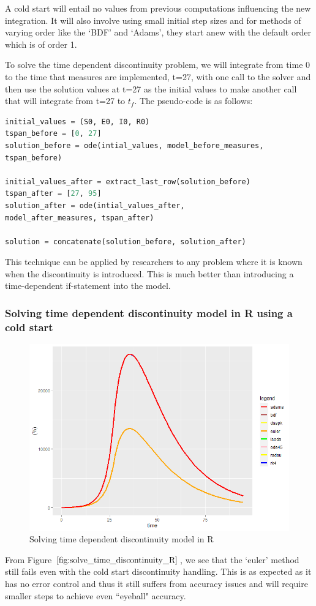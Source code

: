A cold start will entail no values from previous computations influencing the new integration. It will also involve using small initial step sizes and for methods of varying order like the `BDF' and `Adams', they start anew with the default order which is of order 1.

To solve the time dependent discontinuity problem, we will integrate from time 0 to the time that measures are implemented, t=27, with one call to the solver and then use the solution values at t=27 as the initial values to make another call that will integrate from t=27 to $t_f$. The pseudo-code is as follows:

\begin{minipage}{\linewidth}
\begin{lstlisting}[language=Python]
initial_values = (S0, E0, I0, R0)
tspan_before = [0, 27]
solution_before = ode(intial_values, model_before_measures,
tspan_before)

initial_values_after = extract_last_row(solution_before)
tspan_after = [27, 95]
solution_after = ode(intial_values_after, 
model_after_measures, tspan_after)

solution = concatenate(solution_before, solution_after)
\end{lstlisting}
\end{minipage}

This technique can be applied by researchers to any problem where it is known when the discontinuity is introduced. This is much better than introducing a time-dependent if-statement into the model.

\subsubsection{Solving time dependent discontinuity model in R using a cold start} 
\begin{figure}[h]
\centering
\includegraphics[width=0.7\linewidth]{./figures/solve_time_discontinuity_R}
\caption{Solving time dependent discontinuity model in R}
\label{fig:solve_time_discontinuity_R}
\end{figure}
From Figure $\ref{fig:solve_time_discontinuity_R}$, we see that the `euler' method still fails even with the cold start discontinuity handling. This is as expected as it has no error control and thus it still suffers from accuracy issues and will require smaller steps to achieve even ``eyeball" accuracy.

